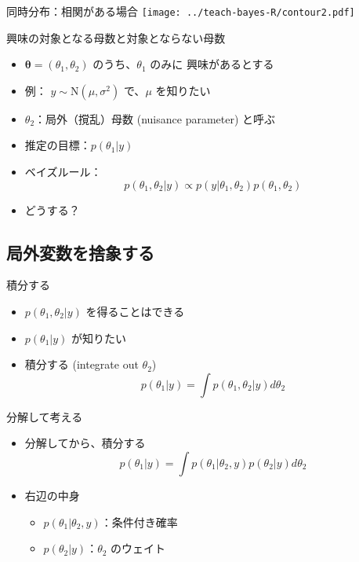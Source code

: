 \documentclass[dvipdfmx,handout]{beamer}
\begin{document}
 \begin{frame}{同時分布：相関がある場合}
   \centering
  \texttt{[image: ../teach-bayes-R/contour2.pdf]}
 \end{frame}

 

 \begin{frame}{興味の対象となる母数と対象とならない母数}
  \begin{itemize}
   \item $\bm{\theta} = (\theta_1, \theta_2)$ のうち、$\theta_1$ のみに
         興味があるとする
   \item 例： $y \sim \mathrm{N}(\mu, \sigma^2)$ で、$\mu$ を知りたい
   \item $\theta_2$：局外（撹乱）母数 (nuisance parameter) と呼ぶ
   \item 推定の目標：$p(\theta_1 | y)$
   \item ベイズルール：
         \[
          p(\theta_1, \theta_2 | y)\propto p(y | \theta_1, \theta_2) p(\theta_1, \theta_2)
         \]
   \item どうする？
  \end{itemize}
 \end{frame}


 \subsection{局外変数を捨象する}
 
 \begin{frame}{積分する}
  \begin{itemize}
   \item $p(\theta_1, \theta_2 | y)$ を得ることはできる
   \item $p(\theta_1 | y)$ が知りたい
        \pause
   \item 積分する (integrate out $\theta_2$)
        \[
          p(\theta_1 | y) = \int p(\theta_1, \theta_2 | y) d\theta_2
        \]
  \end{itemize}
 \end{frame}

 \begin{frame}{分解して考える}
  \begin{itemize}
   \item 分解してから、積分する
    \[
     p(\theta_1 | y) = \int p(\theta_1 | \theta_2, y)p(\theta_2 | y)d\theta_2
    \]
   \item 右辺の中身
   \begin{itemize}
    \item $p(\theta_1 | \theta_2, y)$：条件付き確率
    \item $p(\theta_2 | y)$：$\theta_2$ のウェイト
   \end{itemize}
  \end{itemize}
 \end{frame}
\end{document}

